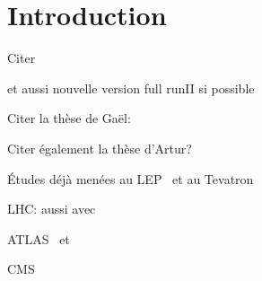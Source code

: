 \section{Introduction}\label{chapter-HTT_analysis-section-introduction}

Citer 

et aussi nouvelle version full runII si possible


Citer la thèse de Gaël:\\

Citer également la thèse d'Artur?\\


Études déjà menées au LEP~\cite{Schael:2006cr} et au Tevatron~\cite{Aaltonen:2009vf,Abazov:2011jh}

LHC: aussi avec \quarkb\antiquarkb~\cite{Chatrchyan:2013qga,Khachatryan:2015tra}

ATLAS \mu\mu\ et \tau\tau~\cite{Aad:2012cfr,ATLAS-MSSM-HTT_2018}

CMS \mu\mu~\cite{CMS:2015ooa} \tau\tau~\cite{Chatrchyan:2012vp,CMS-MSSM-HTT_2014,CMS-PAS-HIG-17-020}